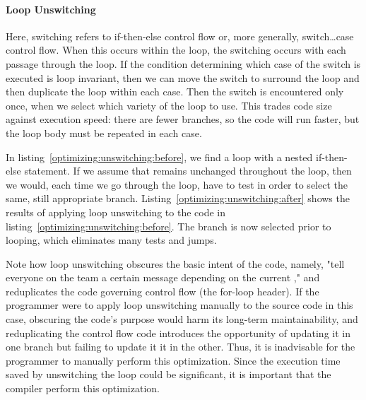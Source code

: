 \paragraph{Loop Unswitching}
Here, switching refers to if-then-else control flow or, more generally, switch\dots{}case control flow. When this occurs within the loop, the switching occurs with each passage through the loop. If the condition determining which case of the switch is executed is loop invariant, then we can move the switch to surround the loop and then duplicate the loop within each case. Then the switch is encountered only once, when we select which variety of the loop to use. This trades code size against execution speed: there are fewer branches, so the code will run faster, but the loop body must be repeated in each case.

In listing~\ref{optimizing:unswitching:before}, we find a loop with a nested if-then-else statement. If we assume that  remains unchanged throughout the loop, then we would, each time we go through the loop, have to test  in order to select the same, still appropriate branch. Listing~\ref{optimizing:unswitching:after} shows the results of applying loop unswitching to the code in listing~\ref{optimizing:unswitching:before}. The branch is now selected prior to looping, which eliminates many tests and jumps.

Note how loop unswitching obscures the basic intent of the code, namely, "tell everyone on the team a certain message depending on the current ," and reduplicates the code governing control flow (the for-loop header). If the programmer were to apply loop unswitching manually to the source code in this case, obscuring the code's purpose would harm its long-term maintainability, and reduplicating the control flow code introduces the opportunity of updating it in one branch but failing to update it it in the other. Thus, it is inadvisable for the programmer to manually perform this optimization. Since the execution time saved by unswitching the loop could be significant, it is important that the compiler perform this optimization.





